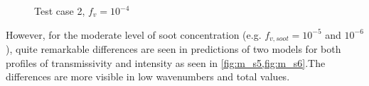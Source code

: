 \documentclass[3p]{elsarticle}
\begin{document}
\begin{figure}[p]
	\centering{}
	\par\medskip		
	\centering{}
	\caption{Test case 2, \({f_v=10^{-4}}\)} \label{fig:m_s4}
\end{figure}

\pagebreak

However, for the moderate level of soot concentration (e.g. \(f_{v,soot}=10^{-5}\) and \(10^{-6}\)), quite remarkable differences are seen in predictions of two models for both profiles of transmissivity and intensity as seen in \cref{fig:m_s5,fig:m_s6}.The differences are more visible in low wavenumbers and total values.
\end{document}
